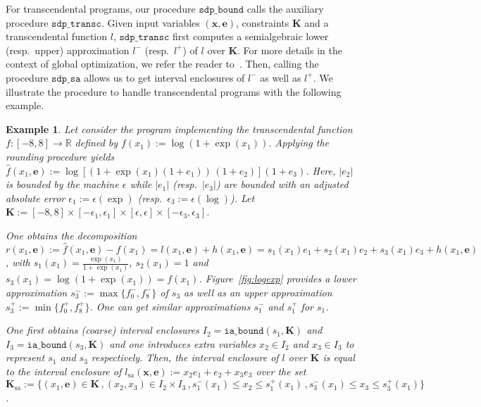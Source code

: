 \documentclass[preprint]{sigplanconf}
\newcommand{\R}{\mathbb{R}}
\newcommand{\x}{\mathbf{x}}
\newcommand{\e}{\mathbf{e}}
\def\K{\mathbf{K}}
\newcommand{\iaboundfun}[2]{\mathtt{ia\_bound}(#1, #2)}
\newcommand{\sdpbound}{\mathtt{sdp\_bound}}
\newcommand{\sa}{_\text{sa}}
\newcommand{\sdpsa}{\mathtt{sdp\_sa}}
\newcommand{\sdptransc}{\mathtt{sdp\_transc}}
\theoremstyle{plain}
\newtheorem{example}{Example}
\begin{document}
For transcendental programs, our procedure $\sdpbound$ calls the auxiliary procedure $\sdptransc$. Given input variables $(\x,\e)$, constraints $\K$ and a transcendental function $l$, $\sdptransc$ first computes a semialgebraic lower (resp.~upper)  approximation $l^-$ (resp.~$l^+$) of $l$ over $\K$. For more details in the context of global optimization, we refer the reader to~\cite{Magron15sdp}. Then, calling the procedure $\sdpsa$ allows us to get interval enclosures of $l^-$ as well as $l^+$.
We illustrate the procedure to handle transcendental programs with the following example.
\begin{example}
\label{ex:logexp}
Let consider the program implementing the transcendental function $f : [-8, 8] \to \R$ defined by $f(x_1) := \log (1 + \exp(x_1))$. Applying the rounding procedure  yields $\hat{f}(x_1,\e) := \log [(1 + \exp(x_1) (1 + e_1)) \, (1 + e_2)](1 + e_3)$. 
Here, $|e_2|$ is bounded by the machine $\epsilon$ while $|e_1|$ (resp.~$|e_3|$) are bounded with an adjusted absolute error $\epsilon_1 := \epsilon(\exp)$ (resp.~$\epsilon_3 := \epsilon(\log)$).
Let $\K:= [-8,8] \times [-\epsilon_1, \epsilon_1] \times [\epsilon, \epsilon] \times [-\epsilon_3, \epsilon_3]$.

One obtains the decomposition $r(x_1, \e) := \hat{f}(x_1,\e) - f(x_1) = l(x_1,\e) + h(x_1,\e) = s_1 (x_1) e_1 + s_2 (x_1) e_2 + s_3 (x_1) e_3 + h(x_1, \e)$, with 
$s_1(x_1) = \frac{\exp(x_1)} {1 + \exp(x_1)}$, $s_2(x_1) = 1$ and $s_3(x_1) = \log (1 + \exp(x_1)) = f(x_1)$. Figure~\ref{fig:logexp} provides a lower approximation $s_3^- := \max\{f_0^-,f_8^-\}$ of $s_3$ as well as an upper approximation $s_3^+ := \min \{f_0^+,f_8^+\}$. One can get similar approximations $s_1^-$ and $s_1^+$ for $s_1$. 

One first obtains (coarse) interval enclosures $I_2 = \iaboundfun{s_1}{\K}$ and $I_3 = \iaboundfun{s_3}{\K}$ and one introduces extra variables $x_2 \in I_2$ and $x_3 \in I_3$ to represent $s_1$ and $s_3$ respectively.
Then, the interval enclosure of $l$ over $\K$ is equal to the interval enclosure of $l\sa(\x,\e) := x_2 e_1 + e_2 + x_3 e_3$ over the set $\K\sa:= \{(x_1,\e) \in \K \,, (x_2, x_3) \in I_2 \times I_3 \,, s_1^-(x_1) \leq x_2 \leq s_1^+(x_1) \,, s_3^-(x_1) \leq x_3 \leq s_3^+(x_1) \}$.
\end{example}
%
\end{document}
